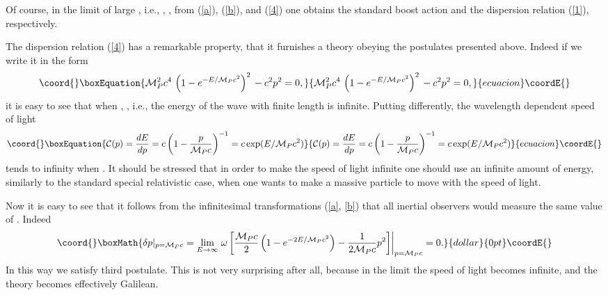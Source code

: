 \documentclass [11pt] {article}
\begin{document}
 Of course, in the
 limit of large  \coordHE{}, i.e., \coordHE{},
 \coordHE{}, from (\ref{a}), (\ref{b}), and (\ref{4}) one obtains the
 standard boost action and the dispersion relation (\ref{1}), respectively.



 The dispersion relation (\ref{4}) has a remarkable property, that it
 furnishes a theory
  obeying the postulates presented above. Indeed if we write it in the form
\begin{equation}\coord{}\boxEquation{\label{5}
 {\cal M}^2_P c^4\,\left(1- e^{-E/{\cal M}_P
 c^2}\right)^2\,
  -c^2p^2 =0,
}{{\cal M}^2_P c^4\,\left(1- e^{-E/{\cal M}_P
 c^2}\right)^2\,
  -c^2p^2 =0,
}{ecuacion}\coordE{}\end{equation}
  it is easy to see that when \coordHE{},
  \coordHE{}, i.e., the energy of the wave with
  finite length is infinite. Putting differently, the wavelength dependent
  speed of
  light
\begin{equation}\coord{}\boxEquation{\label{6}
 {\cal C}(p) = \frac{dE}{dp} = c \left(1 - \frac{p}{{\cal M}_P c}\right)^{-1} = c\exp(E/{\cal M}_P c^2)
}{{\cal C}(p) = \frac{dE}{dp} = c \left(1 - \frac{p}{{\cal M}_P c}\right)^{-1} = c\exp(E/{\cal M}_P c^2)
}{ecuacion}\coordE{}\end{equation}
tends to infinity when \coordHE{}. It should be stressed 
that in order to make the speed of light infinite one should use an 
infinite amount of energy, similarly to the standard special relativistic 
case, when  one wants to make a massive particle to move with the speed of 
light. 





Now it is easy to see that it follows from the infinitesimal
transformations (\ref{a}, \ref{b}) that all inertial observers
would measure the same value of \coordHE{}. Indeed $$\coord{}\boxMath{ \delta
p|_{p={\cal M}_P c} = \lim_{E \rightarrow \infty} \left.
\omega\left[\frac{{\cal M}_P c}{2} \left( 1 - e^{-2 E/{\cal M}_P
 c^2}\right) - \frac{1}{2{\cal M}_P c} p^2\right]\right|_{p={\cal M}_P
 c}=0.}{dollar}{0pt}\coordE{}$$ In this way we satisfy third
 postulate. This is not very surprising after all, because in the limit 
\coordHE{} the speed of light becomes infinite, and the 
theory becomes effectively Galilean. 
\end{document}
